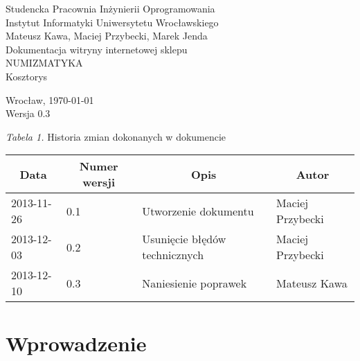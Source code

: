 \documentclass 	[11pt, a4paper, leqno]	{article}					%
\begin{document}

\begin{center}
	\thispagestyle{empty} 							%
	{\large Studencka Pracownia Inżynierii Oprogramowania} 		\\ [0.5cm]
	{\large Instytut Informatyki Uniwersytetu Wrocławskiego} 	\\ [6.0cm]

	{\large Mateusz Kawa, Maciej Przybecki, Marek Jenda} 		\\ [1.5cm]

	{\huge Dokumentacja witryny internetowej sklepu} 			\\ [0.5cm]
	{\huge NUMIZMATYKA} 										\\ [1.5cm]

	{\large Kosztorys} 										\\ [0.5cm]

	\vfill
	
	{\large Wrocław, \today}									\\ [0.5cm]
	{\large Wersja 0.3}
\end{center}

\newpage


\textit{Tabela 1.} Historia zmian dokonanych w dokumencie

\begin{center}
	\begin{tabular}{| l | l | l | l |}
		\hline
		\multicolumn{1}{|c|}{Data} & 
		\multicolumn{1}{|c|}{Numer wersji} &  
		\multicolumn{1}{|c|}{Opis} &
		\multicolumn{1}{|c|}{Autor} \\ \hline \hline
		2013-11-26 & 0.1 & Utworzenie dokumentu & Maciej Przybecki \\ \hline
		2013-12-03 & 0.2 & Usunięcie błędów technicznych & Maciej Przybecki \\ \hline
		2013-12-10 & 0.3 & Naniesienie poprawek & Mateusz Kawa \\ \hline
	\end{tabular}
\end{center}
\newpage


\tableofcontents

\newpage

\section{Wprowadzenie}
\end{document}
